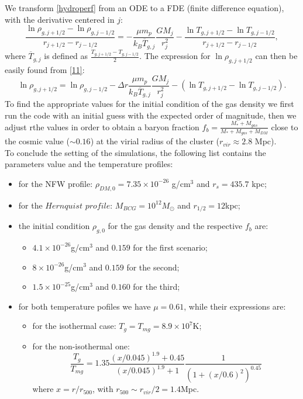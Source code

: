 \documentclass{article}
\begin{document}
We transform \eqref{hydroperf} from an ODE to a FDE (finite difference equation), with the derivative centered in $j$:
\begin{equation}\label{11}
	\frac{\ln \rho_{g,j+1/2}-\ln \rho_{g,j-1/2}}{r_{j+1/2}-r_{j-1/2}}=-\frac{\mu m_{p}}{k_{B}\overline{T}_{g,j}}\frac{GM_{j}}{r_{j}^{2}}-\frac{\ln T_{g,j+1/2}-\ln T_{g,j-1/2}}{r_{j+1/2}-r_{j-1/2}},
\end{equation}
where $\overline{T}_{g,j}$ is defined as $\frac{T_{g,j+1/2}-T_{g,j-1/2}}{2}$. The expression for $\ln \rho_{g,j+1/2}$ can then be easily found from \eqref{11}:
\begin{equation} \label{numrho}
	\ln\rho_{g,j+1/2}=\ln\rho_{g,j-1/2}-\Delta r\frac{\mu m_{p}}{k_{B}\overline{T}_{g,j}}\frac{GM_{j}}{r_{j}^{2}}-(\ln T_{g,j+1/2}-\ln T_{g,j-1/2}).
\end{equation}
To find the appropriate values for the initial condition of the gas density we first run the code with an initial guess with the expected order of magnitude, then we adjust rthe values in order
to obtain a baryon fraction $f_{b}=\frac{M_{*}+M_{gas}}{M_{*}+M_{gas}+M_{DM}}$ close to the cosmic value ($\sim 0.16$) at the virial radius of the cluster ($r_{vir}\approx 2.8$ Mpc).\\
To conclude the setting of the simulations, the following list contains the parameters value and the temperature profiles:
\begin{itemize}
	\item for the NFW profile: $\rho_{DM,0}=7.35\times 10^{-26}$ g/cm$^{3}$ and $r_{s}=435.7$ kpc;
	\item for the $Hernquist$ $ profile$: $M_{BCG}=10^{12} M_{\odot}$ and $r_{1/2}=12$kpc;
	\item the initial condition $\rho_{g,0}$ for the gas density and the respective $f_{b}$ are: \begin{itemize}
		\item $4.1\times 10^{-26}$g/cm$^{3}$ and $0.159$ for the first scenario;
		\item $8\times 10^{-26}$g/cm$^{3}$ and $0.159$ for the second;
		\item $1.5\times 10^{-25}$g/cm$^{3}$ and $0.160$ for the third;
	\end{itemize}
	\item for both temperature pofiles we have $\mu=0.61$, while their expressions are:
	\begin{itemize}
		\item for the isothermal case: $T_{g}=T_{mg}=8.9\times 10^{7}$K;
		\item for the non-isothermal one:
		\begin{equation}\label{Tprof}
			\frac{T_{g}}{T_{mg}}=1.35\frac{(x/0.045)^{1.9}+0.45}{(x/0.045)^{1.9}+1}\frac{1}{(1+(x/0.6)^{2})^{0.45}}
		\end{equation}
		where $x=r/r_{500}$, with $r_{500}\sim r_{vir}/2=1.4$Mpc.
	\end{itemize}
\end{itemize}
\end{document}
